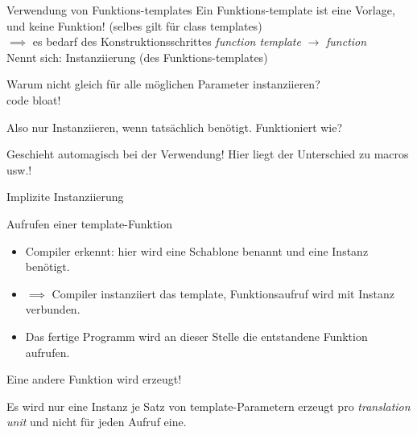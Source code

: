 \begin{frame}{Verwendung von Funktions-templates}
	Ein Funktions-template ist eine Vorlage, und keine Funktion! (selbes gilt für class templates)\\
	$\implies$ es bedarf des Konstruktionsschrittes \emph{function template} $\rightarrow$ \emph{function}\\
	Nennt sich: Instanziierung (des Funktions-templates)
	
	\vspace{1em}
	
	Warum nicht gleich für alle möglichen Parameter instanziieren?\\
	\pause
	\alert<+>{code bloat!}
	
	\uncover<+->
	{
		\vspace{1em}
		Also nur Instanziieren, wenn tatsächlich benötigt. Funktioniert wie?
	}
	
	\uncover<+->
	{
		\vspace{1em}
		Geschieht \alert{automagisch bei der Verwendung}! Hier liegt der Unterschied zu macros usw.!
	}
\end{frame}

\begin{frame}{Implizite Instanziierung}
	\begin{block}{Aufrufen einer template-Funktion}
		
	\end{block}
	
	\pause
	
	\begin{itemize}
		\item Compiler erkennt: hier wird eine Schablone benannt und eine Instanz benötigt. \\
		\item $\implies$ Compiler instanziiert das template, Funktionsaufruf wird mit Instanz verbunden.
		\item Das fertige Programm wird an dieser Stelle die entstandene Funktion aufrufen.
	\end{itemize}
	
	\pause
	
	
	Eine andere Funktion wird erzeugt!
	
	Es wird nur eine Instanz je Satz von template-Parametern erzeugt pro \emph{translation unit} und nicht für jeden Aufruf eine.
\end{frame}

